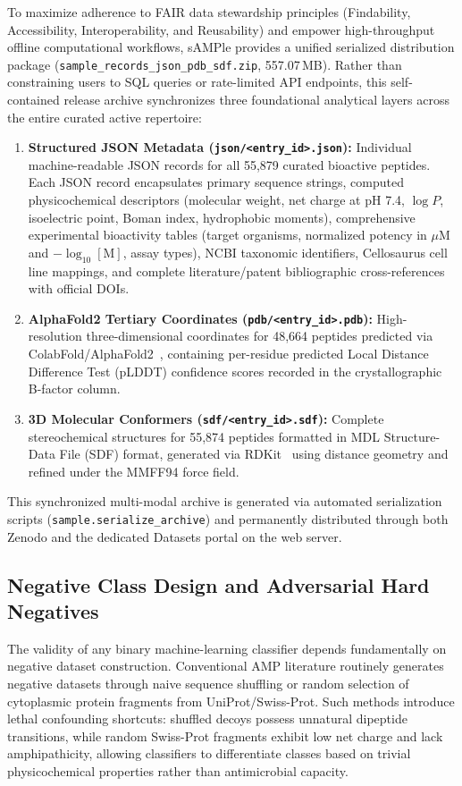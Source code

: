 \documentclass[unnumsec,webpdf,contemporary,large]{oup-authoring-template}%
\begin{document}
To maximize adherence to FAIR data stewardship principles (Findability, Accessibility, Interoperability, and Reusability) and empower high-throughput offline computational workflows, sAMPle provides a unified serialized distribution package (\texttt{sample\_records\_json\_pdb\_sdf.zip}, 557.07\,MB). Rather than constraining users to SQL queries or rate-limited API endpoints, this self-contained release archive synchronizes three foundational analytical layers across the entire curated active repertoire:
\begin{enumerate}
    \item \textbf{Structured JSON Metadata (\texttt{json/<entry\_id>.json}):} Individual machine-readable JSON records for all 55,879 curated bioactive peptides. Each JSON record encapsulates primary sequence strings, computed physicochemical descriptors (molecular weight, net charge at pH 7.4, $\log P$, isoelectric point, Boman index, hydrophobic moments), comprehensive experimental bioactivity tables (target organisms, normalized potency in $\mu\text{M}$ and $-\log_{10}[\text{M}]$, assay types), NCBI taxonomic identifiers, Cellosaurus cell line mappings, and complete literature/patent bibliographic cross-references with official DOIs.
    \item \textbf{AlphaFold2 Tertiary Coordinates (\texttt{pdb/<entry\_id>.pdb}):} High-resolution three-dimensional coordinates for 48,664 peptides predicted via ColabFold/AlphaFold2~\cite{jumper2021highly,mirdita2022colabfold}, containing per-residue predicted Local Distance Difference Test (pLDDT) confidence scores recorded in the crystallographic B-factor column.
    \item \textbf{3D Molecular Conformers (\texttt{sdf/<entry\_id>.sdf}):} Complete stereochemical structures for 55,874 peptides formatted in MDL Structure-Data File (SDF) format, generated via RDKit~\cite{landrum2013rdkit} using distance geometry and refined under the MMFF94 force field.
\end{enumerate}
This synchronized multi-modal archive is generated via automated serialization scripts (\texttt{sample.serialize\_archive}) and permanently distributed through both Zenodo and the dedicated Datasets portal on the web server.

\subsection{Negative Class Design and Adversarial Hard Negatives}

The validity of any binary machine-learning classifier depends fundamentally on negative dataset construction. Conventional AMP literature routinely generates negative datasets through naive sequence shuffling or random selection of cytoplasmic protein fragments from UniProt/Swiss-Prot. Such methods introduce lethal confounding shortcuts: shuffled decoys possess unnatural dipeptide transitions, while random Swiss-Prot fragments exhibit low net charge and lack amphipathicity, allowing classifiers to differentiate classes based on trivial physicochemical properties rather than antimicrobial capacity.
\end{document}

